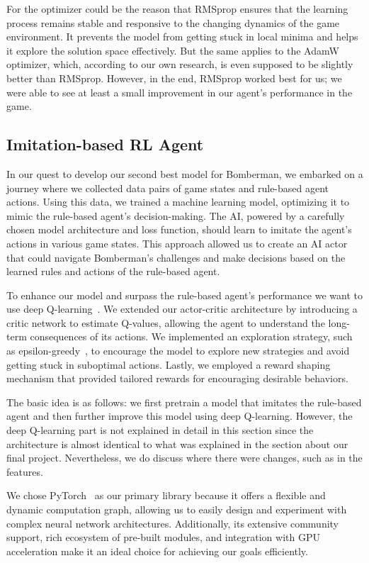 For the optimizer could be the reason that RMSprop ensures that the learning process remains stable and responsive to the changing dynamics 
of the game environment. It prevents the model from getting stuck in local minima and helps it explore the solution space effectively.
But the same applies to the AdamW optimizer, which, according to our own research, is even supposed to be slightly better than RMSprop. 
However, in the end, RMSprop worked best for us; we were able to see at least a small improvement in our agent's performance in the game.

\newpage
{}
\subsection{Imitation-based RL Agent}

In our quest to develop our second best model for Bomberman, we embarked on a journey where we collected data pairs of game 
states and rule-based agent actions. Using this data, we trained a machine learning model, optimizing it to mimic 
the rule-based agent's decision-making. The AI, powered by a carefully chosen model architecture and loss function, 
should learn to imitate the agent's actions in various game states. This approach allowed us to create an AI actor 
that could navigate Bomberman's challenges and make decisions based on the learned rules and actions of the rule-based agent.

To enhance our model and surpass the rule-based agent's performance we want to use deep Q-learning~\cite{Art:torchQlearn}. We extended our actor-critic architecture by 
introducing a critic network to estimate Q-values, allowing the agent to understand the long-term consequences of its actions. 
We implemented an exploration strategy, such as epsilon-greedy~\cite{Onl:greedy}, to encourage the model to explore new strategies and avoid getting 
stuck in suboptimal actions. Lastly, we employed a reward shaping mechanism that provided tailored rewards for encouraging desirable behaviors.

The basic idea is as follows: we first pretrain a model that imitates the rule-based agent and then further improve this model using deep Q-learning. 
However, the deep Q-learning part is not explained in detail in this section since the architecture is almost identical to what was explained in the 
section about our final project. Nevertheless, we do discuss where there were changes, such as in the features.

We chose PyTorch~\cite{Onl:pytorch} as our primary library because it offers a flexible and dynamic computation graph, allowing us to easily design and 
experiment with complex neural network architectures. Additionally, its extensive community support, rich ecosystem of pre-built modules, 
and integration with GPU acceleration make it an ideal choice for achieving our goals efficiently.

